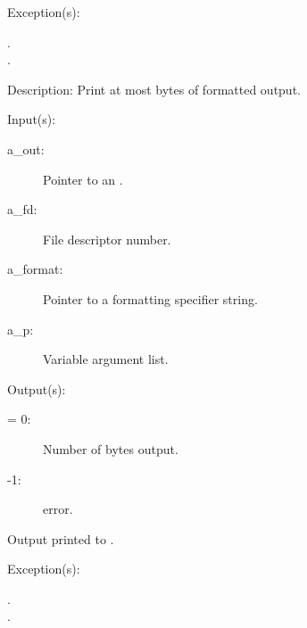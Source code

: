 \begin{capi}
\begin{capilist}
\begin{description}
		\end{description}
	\item[Exception(s): ]
		\begin{description}\item[]
		\item[.]
		\item[.]
		\end{description}
	\item[Description: ]
		Print at most  bytes of formatted output.
	\end{capilist}
\label{out_put_fv}
	\begin{capilist}
	\item[Input(s): ]
		\begin{description}\item[]
		\item[a\_out: ]
			Pointer to an .
		\item[a\_fd: ]
			File descriptor number.
		\item[a\_format: ]
			Pointer to a formatting specifier string.
		\item[a\_p: ]
			Variable argument list.
		\end{description}
	\item[Output(s): ]
		\begin{description}\item[]
		\item[retval: ]
			\begin{description}\item[]
			\item[{\gt}= 0: ]
				Number of bytes output.
			\item[-1: ]
				 error.
			\end{description}
		\item{Output printed to .}
		\end{description}
	\item[Exception(s): ]
		\begin{description}\item[]
		\item[.]
		\item[.]
		\end{description}

\end{capilist}
\end{capi}
